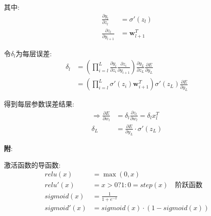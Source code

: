 \documentclass{article}
\begin{document}
        	    其中:
        		    \begin{align*}
        		        \frac{\partial y_l}{\partial z_l} &= \sigma'(z_l)\\
        		        \frac{\partial z_l}{\partial y_{l+1}} &= \boldsymbol w_{l+1}^T
        		    \end{align*}
        		    
        		令$\delta_l$为每层误差:
        		    \begin{align*}
        		        \delta_l &=\left(\prod_{i = l}^{L} \frac{\partial y_i}{\partial z_i}\frac{\partial z_i}{\partial y_{i+1}} \right) \frac{\partial y_L}{\partial z_L} \frac{\partial E}{\partial y_L}\\
        		        &= \left(\prod_{i = l}^{L} \sigma'(z_i)\boldsymbol w_{i+1}^T\right) \sigma '(z_L)\frac{\partial E}{\partial y_L}
        		    \end{align*}
        		    
        		得到每层参数误差结果:
        		    \begin{align*}
        		        \Rightarrow \frac{\partial E}{\partial w_l} &= \delta_l \frac{\partial z_l}{\partial w_l} = \delta_l x_l^T\\
        		        \delta_L &= \frac{\partial E}{\partial y_L} ·\sigma '(z_L)
        		    \end{align*}
        		    
            \textbf{附}:
            
        		激活函数的导函数:
        		    \begin{align*}
        		        relu(x) &= \max(0, x)\\
        		        relu'(x) &= x > 0 ? 1 : 0 = step(x) \quad \text{阶跃函数}\\
        		        sigmoid(x) &= \frac{1}{1+e^{-x}}\\
        		        sigmoid'(x) &= sigmoid(x) · (1 - sigmoid(x))
        		    \end{align*}
\end{document}
